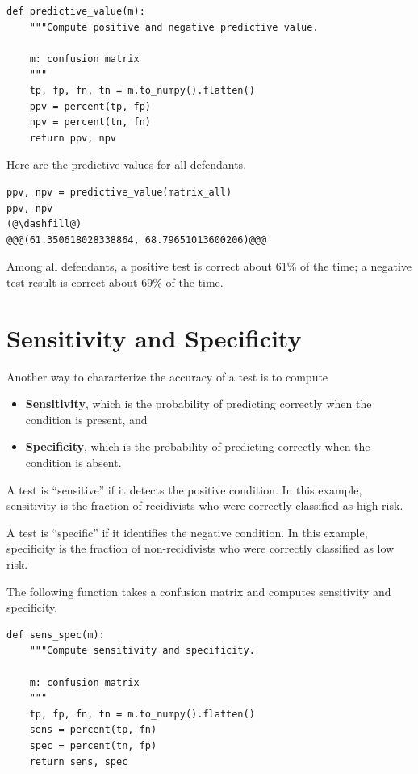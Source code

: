 \begin{lstlisting}[]
def predictive_value(m):
    """Compute positive and negative predictive value.
    
    m: confusion matrix
    """
    tp, fp, fn, tn = m.to_numpy().flatten()
    ppv = percent(tp, fp)
    npv = percent(tn, fn)
    return ppv, npv
\end{lstlisting}

Here are the predictive values for all defendants.

\begin{lstlisting}[]
ppv, npv = predictive_value(matrix_all)
ppv, npv
(@\dashfill@)
@@@(61.350618028338864, 68.79651013600206)@@@
\end{lstlisting}

Among all defendants, a positive test is correct about 61\% of the time;
a negative test result is correct about 69\% of the time.

\hypertarget{sensitivity-and-specificity}{%
\section{Sensitivity and
Specificity}\label{sensitivity-and-specificity}}

Another way to characterize the accuracy of a test is to compute

\begin{itemize}
\item
  \textbf{Sensitivity}, which is the probability of predicting correctly
  when the condition is present, and
\item
  \textbf{Specificity}, which is the probability of predicting correctly
  when the condition is absent.
\end{itemize}

A test is ``sensitive'' if it detects the positive condition. In this
example, sensitivity is the fraction of recidivists who were correctly
classified as high risk.

A test is ``specific'' if it identifies the negative condition. In this
example, specificity is the fraction of non-recidivists who were
correctly classified as low risk.

The following function takes a confusion matrix and computes sensitivity
and specificity.

\begin{lstlisting}[]
def sens_spec(m):
    """Compute sensitivity and specificity.
    
    m: confusion matrix
    """
    tp, fp, fn, tn = m.to_numpy().flatten()
    sens = percent(tp, fn)
    spec = percent(tn, fp)
    return sens, spec
\end{lstlisting}

